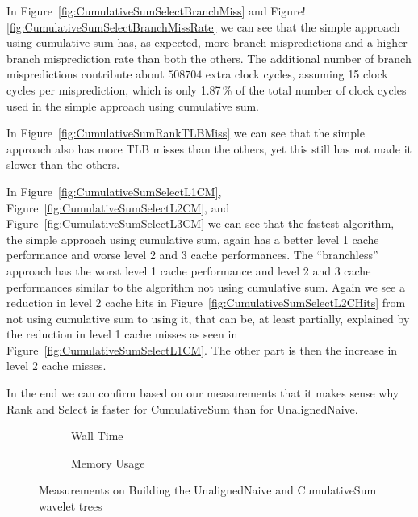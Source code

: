 In Figure~\ref{fig:CumulativeSumSelectBranchMiss} and Figure!\ref{fig:CumulativeSumSelectBranchMissRate} we can see that the simple approach using cumulative sum has, as expected, more branch mispredictions and a higher branch misprediction rate than both the others.
The additional number of branch mispredictions contribute about $\num{508704}$ extra clock cycles, assuming 15 clock cycles per misprediction, which is only 1.87\,\% of the total number of clock cycles used in the simple approach using cumulative sum.

In Figure~\ref{fig:CumulativeSumRankTLBMiss} we can see that the simple approach also has more TLB misses than the others, yet this still has not made it slower than the others.

In Figure~\ref{fig:CumulativeSumSelectL1CM}, Figure~\ref{fig:CumulativeSumSelectL2CM}, and Figure~\ref{fig:CumulativeSumSelectL3CM} we can see that the fastest algorithm, the simple approach using cumulative sum, again has a better level 1 cache performance and worse level 2 and 3 cache performances.
The “branchless” approach has the worst level 1 cache performance and level 2 and 3 cache performances similar to the algorithm not using cumulative sum.
Again we see a reduction in level 2 cache hits in Figure~\ref{fig:CumulativeSumSelectL2CHits} from not using cumulative sum to using it, that can be, at least partially, explained by the reduction in level 1 cache misses as seen in Figure~\ref{fig:CumulativeSumSelectL1CM}.
The other part is then the increase in level 2 cache misses.

In the end we can confirm based on our measurements that it makes sense why Rank and Select is faster for CumulativeSum than for UnalignedNaive.







\begin{figure}\tiny
\begin{subfigure}{0.48\textwidth}
	
	\caption{Wall Time}
	\label{fig:CumulativeSumBuildWalltime}
\end{subfigure}
\hfill
\begin{subfigure}{0.48\textwidth}
	
	\caption{Memory Usage}
	\label{fig:CumulativeSumBuildMemoryUsage}
\end{subfigure}
\caption{Measurements on Building the UnalignedNaive and CumulativeSum wavelet trees}
\label{fig:CumulativeSumBuild}
\end{figure}


